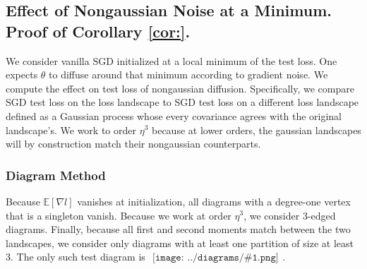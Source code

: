 \documentclass{article}
\theoremstyle{plain}
\theoremstyle{definition}
\newcommand{\expct}[1]{\mathbb{E}\left[#1\right]}
\newcommand{\sdia}[1]{\begin{gathered}\texttt{[image: ../diagrams/\#1.png]}\end{gathered}}
\begin{document}
    \subsection{
        Effect of Nongaussian Noise at a Minimum.
        Proof of Corollary \ref{cor:}.
    }
        We consider vanilla SGD initialized at a local minimum of the test loss.
        One expects $\theta$ to diffuse around that minimum according to
        gradient noise.  We compute the effect on test loss of nongaussian
        diffusion.  Specifically, we compare SGD test loss on the loss
        landscape to SGD test loss on a different loss landscape defined as a
        Gaussian process whose every covariance agrees with the original
        landscape's.  We work to order $\eta^3$ because at lower orders,
        the gaussian landscapes will by construction match their nongaussian
        counterparts.

        \subsubsection*{Diagram Method}
            Because $\expct{\nabla l}$ vanishes at initialization, all diagrams
            with a degree-one vertex that is a singleton vanish.  Because we
            work at order $\eta^3$, we consider $3$-edged diagrams.  Finally,
            because all first and second moments match between the two
            landscapes, we consider only diagrams with at least one partition
            of size at least $3$.  The only such test diagram is
            $\sdia{c(012-3)(03-13-23)}$.
\end{document}
